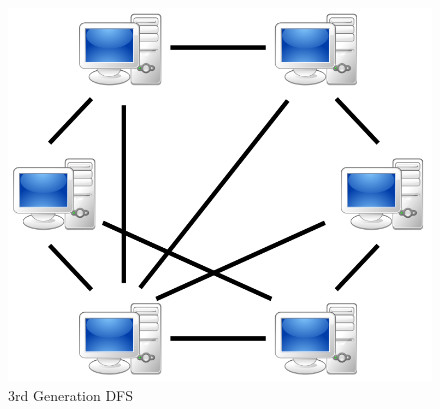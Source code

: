 	\begin{figure}[H]
		\begin{center}
		\includegraphics[scale=0.25]{Talk5/3rd_gen_dfs.PNG}
		\end{center}
		\caption{3rd Generation DFS \cite{wikimedia:p2p}}
		\label{3rd_gen_dfs}
	\end{figure}

